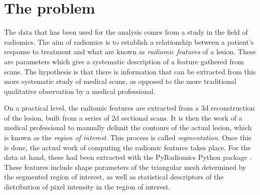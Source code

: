 \documentclass[../main.tex]{subfiles}
\begin{document}
\section{The problem}
The data that has been used for the analysis comes from a study in the field of radiomics.
The aim of radiomics is to establish a relationship between a patient's response to
treatment and what are known as \emph{radiomic features} of a lesion. These are parameters
which give a systematic description of a feature gathered from scans. The hypothesis is
that there is information that can be extracted from this more systematic study of medical
scans, as opposed to the more traditional qualitative observation by a medical
professional. 

On a practical level, the radiomic features are extracted from a 3d reconstruction of the
lesion, built from a series of 2d sectional scans. It is then the work of a medical
professional to manually delimit the contours of the actual lesion, which is known as the
\emph{region of interest}. This process is called \emph{segmentation}. Once this is done,
the actual work of computing the radiomic features takes place. For the data at hand,
these had been extracted with the \textsf{PyRadiomics} Python package \cite{pyradiomics}.
These features include shape parameters of the triangular mesh determined by the segmented
region of interest, as well as statistical descriptors of the distribution of pixel
intensity in the region of interest. 
\end{document}
